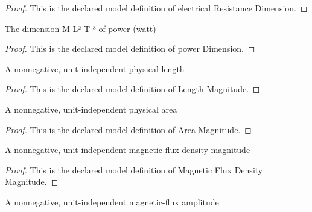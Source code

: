 \begin{proof}
  This is the declared model definition of electrical Resistance Dimension.
\end{proof}
\begin{definition}
  \label{def:physics:phyx-mini-0932:phyxminiproblems-problemphyxmini0932-powerdimension}
  The dimension M L² T⁻³ of power (watt)
\end{definition}
\begin{proof}
  This is the declared model definition of power Dimension.
\end{proof}
\begin{definition}
  \label{def:physics:phyx-mini-0932:phyxminiproblems-problemphyxmini0932-lengthmagnitude}
  A nonnegative, unit-independent physical length
\end{definition}
\begin{proof}
  This is the declared model definition of Length Magnitude.
\end{proof}
\begin{definition}
  \label{def:physics:phyx-mini-0932:phyxminiproblems-problemphyxmini0932-areamagnitude}
  A nonnegative, unit-independent physical area
\end{definition}
\begin{proof}
  This is the declared model definition of Area Magnitude.
\end{proof}
\begin{definition}
  \label{def:physics:phyx-mini-0932:phyxminiproblems-problemphyxmini0932-magneticfluxdensitymagnitude}
  A nonnegative, unit-independent magnetic-flux-density magnitude
\end{definition}
\begin{proof}
  This is the declared model definition of Magnetic Flux Density Magnitude.
\end{proof}
\begin{definition}
  \label{def:physics:phyx-mini-0932:phyxminiproblems-problemphyxmini0932-magneticfluxmagnitude}
  A nonnegative, unit-independent magnetic-flux amplitude
\end{definition}
